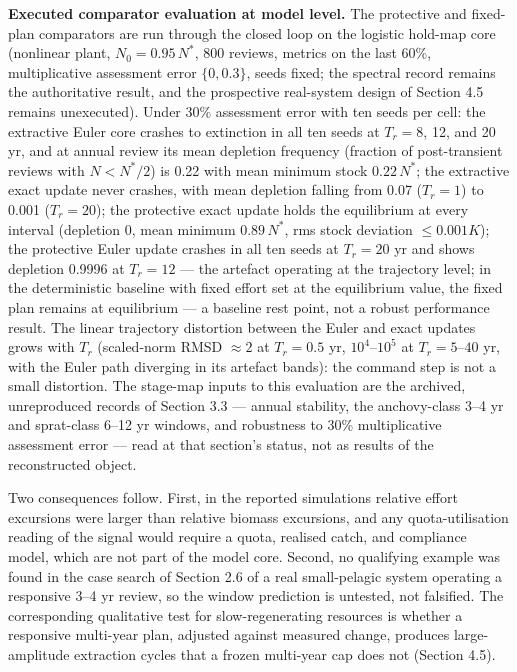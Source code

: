 \documentclass[11pt]{article}
\begin{document}
\textbf{Executed comparator evaluation at model level.} The protective
and fixed-plan comparators are run through the closed loop on
the logistic hold-map core (nonlinear plant, \(N_0 = 0.95\,N^*\), 800
reviews, metrics on the last 60\%, multiplicative assessment error
\(\{0, 0.3\}\), seeds fixed; the spectral record remains the authoritative
result, and the prospective real-system design of Section 4.5 remains
unexecuted). Under 30\% assessment error with ten seeds per cell: the
extractive Euler core crashes to extinction in all ten seeds at
\(T_r = 8\), 12, and 20 yr, and at annual review its mean depletion
frequency (fraction of post-transient reviews with \(N < N^*/2\)) is
0.22 with mean minimum stock \(0.22\,N^*\); the extractive exact update
never crashes, with mean depletion falling from 0.07 (\(T_r = 1\)) to
0.001 (\(T_r = 20\)); the protective exact update holds the equilibrium
at every interval (depletion 0, mean minimum \(0.89\,N^*\), rms stock
deviation \(\le 0.001K\)); the protective Euler update crashes in all
ten seeds at \(T_r = 20\) yr and shows depletion 0.9996 at \(T_r = 12\)
--- the artefact operating at the trajectory level; in the deterministic baseline with fixed effort set at the equilibrium value, the fixed plan remains at equilibrium --- a baseline rest point, not a robust performance result. The linear trajectory
distortion between the Euler and exact updates grows with \(T_r\)
(scaled-norm RMSD \(\approx 2\) at \(T_r = 0.5\) yr, \(10^4\)--\(10^5\)
at \(T_r = 5\)--\(40\) yr, with the Euler path diverging in its artefact
bands): the command step is not a small distortion. The stage-map
inputs to this evaluation are the archived, unreproduced records of
Section 3.3 --- annual stability, the anchovy-class 3--4 yr and
sprat-class 6--12 yr windows, and robustness to 30\% multiplicative
assessment error --- read at that section's status, not as results of
the reconstructed object.

Two consequences follow. First, in the reported simulations relative
effort excursions were larger than relative biomass excursions, and any
quota-utilisation reading of the signal would require a quota, realised
catch, and compliance model, which are not part of the model core.
Second, no qualifying example was found in the case search of Section 2.6 of a real small-pelagic system operating a responsive 3--4
yr review, so the window prediction is untested, not falsified. The
corresponding qualitative test for slow-regenerating resources is
whether a responsive multi-year plan, adjusted against measured change,
produces large-amplitude extraction cycles that a frozen multi-year cap
does not (Section 4.5).
\end{document}
